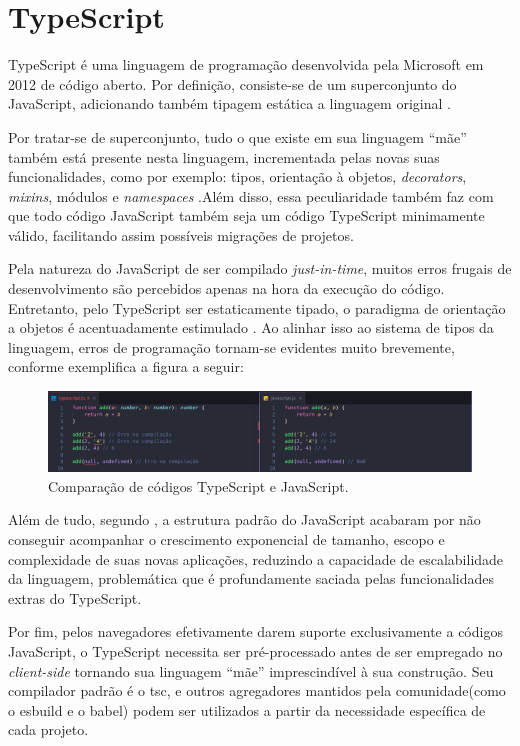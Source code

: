 \section{TypeScript}
\label{sec:typescript}
TypeScript é uma linguagem de programação desenvolvida pela Microsoft em 2012 de código aberto. Por definição, consiste-se de um superconjunto do JavaScript, adicionando também tipagem estática a linguagem original \cite{Microsoft2023}.

Por tratar-se de superconjunto, tudo o que existe em sua linguagem “mãe” também está presente nesta linguagem, incrementada pelas novas suas funcionalidades, como por exemplo: tipos, orientação à objetos, \textit{decorators}, \textit{mixins}, módulos e \textit{namespaces} \cite{Goldberg2022}.Além disso, essa peculiaridade também faz com que todo código JavaScript também seja um código TypeScript minimamente válido, facilitando assim possíveis migrações de projetos.

Pela natureza do JavaScript de ser compilado \textit{just-in-time}, muitos erros frugais de desenvolvimento são percebidos apenas na hora da execução do código. Entretanto, pelo TypeScript ser estaticamente tipado, o paradigma de orientação a objetos é acentuadamente estimulado \cite{Goldberg2022}. Ao alinhar isso ao sistema de tipos da linguagem, erros de programação tornam-se evidentes muito brevemente, conforme exemplifica a  figura a seguir:

\begin{figure}[H]
    \centering
    \caption{Comparação de códigos TypeScript e JavaScript.}
    \label{fig:typescript}
    \includegraphics[width=1\textwidth]{data/figures/typescript-javascript.jpg}
\end{figure}

Além de tudo, segundo , a estrutura padrão do JavaScript acabaram por não conseguir acompanhar o crescimento exponencial de tamanho, escopo e complexidade de suas novas aplicações, reduzindo a capacidade de escalabilidade da linguagem, problemática que é profundamente saciada pelas funcionalidades extras do TypeScript.

Por fim, pelos navegadores efetivamente darem suporte exclusivamente a códigos JavaScript, o TypeScript necessita ser pré-processado antes de ser empregado no \textit{client-side} tornando sua linguagem “mãe” imprescindível à sua construção. Seu compilador padrão é o tsc, e outros agregadores mantidos pela comunidade(como o esbuild e o babel) podem ser utilizados a partir da necessidade específica de cada projeto.

